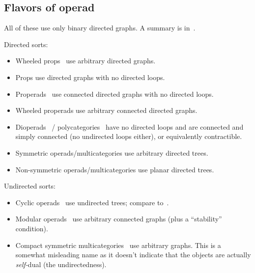 \documentclass{article}
\theoremstyle{definition}
\theoremstyle{remark}
\begin{document}
\subsection{Flavors of operad}
\label{sec:operads}

All of these use only binary directed graphs.
A summary is in~\cite{bb:htapm}.

Directed sorts:
\begin{itemize}
\item Wheeled props~\cite{mms:wheeled-props} use arbitrary directed graphs.
\item Props use directed graphs with no directed loops.
\item Properads~\cite{vallette:properads} use connected directed graphs with no directed loops.
\item Wheeled properads use arbitrary connected directed graphs.
\item Dioperads~\cite{gan:dioperads} / polycategories~\cite{szabo:polycats,koslowski:polycats,garner:polycats} have no directed loops and are connected and simply connected (no undirected loops either), or equivalently contractible.~\cite{markl:operads-props}
\item Symmetric operads/multicategories use arbitrary directed trees.
\item Non-symmetric operads/multicategories use planar directed trees.
\end{itemize}

Undirected sorts:
\begin{itemize}
\item Cyclic operads~\cite{gk:cyclic-operads} use undirected trees; compare to~\cite{co:flang-cyclic}.
\item Modular operads~\cite{gk:modular-operads} use arbitrary connected graphs (plus a ``stability'' condition).
\item Compact symmetric multicategories~\cite{jk:feynman} use arbitrary graphs.
  This is a somewhat misleading name as it doesn't indicate that the objects are actually \emph{self-}dual (the undirectedness).
\end{itemize}



\end{document}
